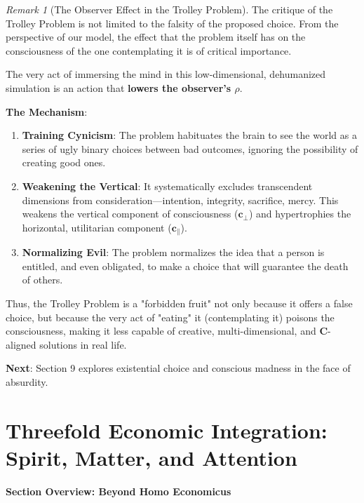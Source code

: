 \documentclass[11pt,a4paper]{article}
\theoremstyle{definition}
\theoremstyle{remark}
\newtheorem{remark}{Remark}[section]
\newcommand{\cc}{\mathbf{c}}
\begin{document}
\begin{enumerate}
\begin{mdframed}[backgroundcolor=green!10,linewidth=2pt,linecolor=green!70!black]
\begin{remark}[The Observer Effect in the Trolley Problem]
The critique of the Trolley Problem is not limited to the falsity of the proposed choice. From the perspective of our model, the effect that the problem itself has on the consciousness of the one contemplating it is of critical importance.

The very act of immersing the mind in this low-dimensional, dehumanized simulation is an action that \textbf{lowers the observer's $\rho$}.

\textbf{The Mechanism}:
\begin{enumerate}
    \item \textbf{Training Cynicism}: The problem habituates the brain to see the world as a series of ugly binary choices between bad outcomes, ignoring the possibility of creating good ones.
    \item \textbf{Weakening the Vertical}: It systematically excludes transcendent dimensions from consideration—intention, integrity, sacrifice, mercy. This weakens the vertical component of consciousness ($\cc_\perp$) and hypertrophies the horizontal, utilitarian component ($\cc_\parallel$).
    \item \textbf{Normalizing Evil}: The problem normalizes the idea that a person is entitled, and even obligated, to make a choice that will guarantee the death of others.
\end{enumerate}
Thus, the Trolley Problem is a "forbidden fruit" not only because it offers a false choice, but because the very act of "eating" it (contemplating it) poisons the consciousness, making it less capable of creative, multi-dimensional, and $\mathbf{C}$-aligned solutions in real life.
\end{remark}

\textbf{Next}: Section 9 explores existential choice and conscious madness in the face of absurdity.
\end{mdframed}


\section{Threefold Economic Integration: Spirit, Matter, and Attention}

\begin{mdframed}[backgroundcolor=cyan!5,linewidth=2pt]
\textbf{Section Overview: Beyond Homo Economicus}
\end{mdframed}


\end{enumerate}
\end{document}
